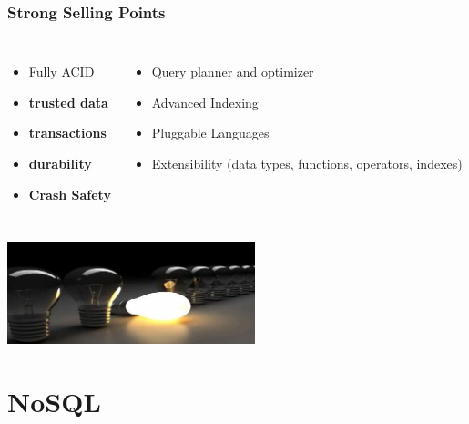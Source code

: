 \documentclass{beamer}
\begin{document}
\begin{frame}[fragile]
  \frametitle{Strong Selling Points}

  \vfill

\begin{columns}[c]

  \begin{itemize}
  \item Fully ACID
  \item \textbf{trusted data}
  \item \textbf{transactions}
  \item \textbf{durability}
  \item \textbf{Crash Safety}
  \end{itemize}


  \begin{itemize}
  \item Query planner and optimizer
  \item Advanced Indexing
  \item Pluggable Languages
  \item Extensibility (data types, functions, operators, indexes)
  \end{itemize}
\end{columns}

\vfill

\begin{center}
  \includegraphics[height=8em]{disruptive-innovationn.jpg}
\end{center}
\end{frame}

\section{NoSQL}
\end{document}
